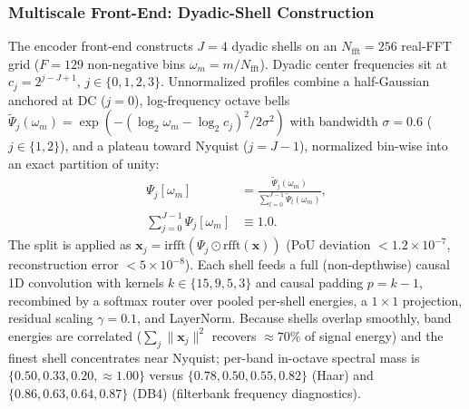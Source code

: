 \subsubsection{Multiscale Front-End: Dyadic-Shell Construction}
\label{sup:frontend_construction}
The encoder front-end constructs $J{=}4$ dyadic shells on an $N_{\text{fft}}=256$ real-FFT grid ($F=129$ non-negative bins $\omega_m = m/N_{\text{fft}}$). Dyadic center frequencies sit at $c_j = 2^{j-J+1}$, $j \in \{0,1,2,3\}$. Unnormalized profiles combine a half-Gaussian anchored at DC ($j=0$), log-frequency octave bells $\tilde{\Psi}_j(\omega_m) = \exp(-(\log_2 \omega_m - \log_2 c_j)^2 / 2\sigma^2)$ with bandwidth $\sigma = 0.6$ ($j \in \{1,2\}$), and a plateau toward Nyquist ($j=J-1$), normalized bin-wise into an exact partition of unity:
\begin{align}
    \Psi_j[\omega_m] &= \frac{\tilde{\Psi}_j(\omega_m)}{\sum_{l=0}^{J-1} \tilde{\Psi}_l(\omega_m)}, \\
    \sum_{j=0}^{J-1} \Psi_j[\omega_m] &\equiv 1.0. \nonumber
\end{align}
The split is applied as $\mathbf{x}_j = \mathrm{irfft}(\Psi_j \odot \mathrm{rfft}(\mathbf{x}))$ (PoU deviation $<1.2\times10^{-7}$, reconstruction error $<5\times10^{-8}$). Each shell feeds a full (non-depthwise) causal 1D convolution with kernels $k \in \{15,9,5,3\}$ and causal padding $p=k-1$, recombined by a softmax router over pooled per-shell energies, a $1{\times}1$ projection, residual scaling $\gamma=0.1$, and LayerNorm. Because shells overlap smoothly, band energies are correlated ($\sum_j \|\mathbf{x}_j\|^2$ recovers $\approx 70\%$ of signal energy) and the finest shell concentrates near Nyquist; per-band in-octave spectral mass is $\{0.50,0.33,0.20,{\approx}1.00\}$ versus $\{0.78,0.50,0.55,0.82\}$ (Haar) and $\{0.86,0.63,0.64,0.87\}$ (DB4) (filterbank frequency diagnostics).

